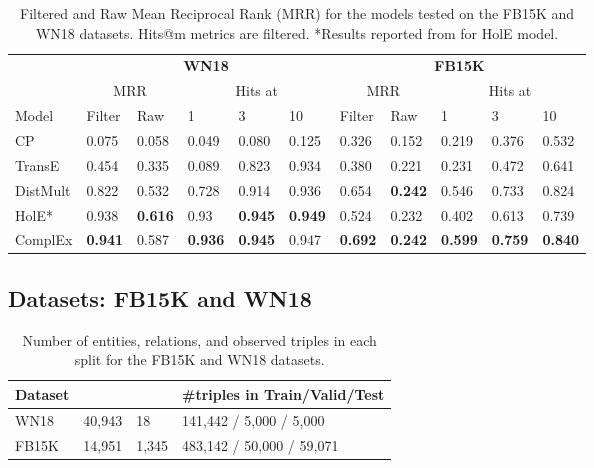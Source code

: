 \documentclass{article}
\begin{document}
\begin{table*}[t]
    \centering
    \begin{tabular}{@{\extracolsep{8pt}}lllllllllll@{}}
        \toprule
        
         & \multicolumn{5}{c}{\textbf{WN18}} & \multicolumn{5}{c}{\textbf{FB15K}} \\ \cline{2-6} \cline{7-11}
         & \multicolumn{2}{c}{MRR} & \multicolumn{3}{c}{Hits at} & \multicolumn{2}{c}{MRR} & \multicolumn{3}{c}{Hits at} \\ \cline{2-3} \cline{4-6} \cline{7-8} \cline{9-11}
        
        Model & Filter & Raw & 1 & 3 & 10 & Filter & Raw & 1 & 3 & 10 \\ \hline
        
        CP & 0.075 & 0.058 & 0.049 & 0.080 & 0.125 & 0.326 & 0.152 & 0.219 & 0.376 & 0.532 \\
        TransE & 0.454 & 0.335 & 0.089 & 0.823 & 0.934 & 0.380 & 0.221 & 0.231 & 0.472 &  0.641 \\
        DistMult & 0.822 & 0.532 & 0.728 & 0.914 & 0.936 & 0.654 & \textbf{0.242} & 0.546 & 0.733   & 0.824 \\ 
        HolE* & 0.938 & \textbf{0.616} & 0.93 & \textbf{0.945} & \textbf{0.949} & 0.524 & 0.232 & 0.402 & 0.613 & 0.739\\ \hline
        ComplEx & \textbf{0.941} &  0.587 &  \textbf{0.936} &  \textbf{0.945} &  0.947 & \textbf{0.692} & \textbf{0.242} & \textbf{0.599} & \textbf{0.759}   & \textbf{0.840} \\
        
        \bottomrule
    \end{tabular}
    \caption{Filtered and Raw Mean Reciprocal Rank (MRR) for the models tested on the FB15K and WN18 datasets. Hits@m metrics are filtered. *Results reported from \cite{nickel_2016_holographic} for HolE model.}
    \label{tab:fb15k_wn18_res}
\end{table*}









\subsection{Datasets: FB15K and WN18}

\begin{table}[h]
    \centering
    \begin{tabular}{l|lll}
        Dataset &  &  & \#triples in Train/Valid/Test \\ \hline
        WN18 & 40,943 & 18 & 141,442 / 5,000 / 5,000 \\
        FB15K & 14,951 & 1,345 & 483,142 / 50,000 / 59,071 \\
    \end{tabular}
    \caption{Number of entities, relations, and observed triples in each split for the FB15K and WN18 datasets.}
    \label{tab:fb15k_wn18_meta}
\end{table}
\end{document}
